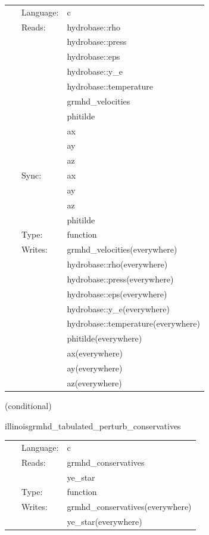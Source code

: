 \documentclass{article}
\begin{document}
 \begin{tabular*}{160mm}{cll} 
~ & Language:  & c \\ 
~ & Reads:  & hydrobase::rho \\ 
~& ~ &hydrobase::press\\ 
~& ~ &hydrobase::eps\\ 
~& ~ &hydrobase::y\_e\\ 
~& ~ &hydrobase::temperature\\ 
~& ~ &grmhd\_velocities\\ 
~& ~ &phitilde\\ 
~& ~ &ax\\ 
~& ~ &ay\\ 
~& ~ &az\\ 
~ & Sync:  & ax \\ 
~& ~ &ay\\ 
~& ~ &az\\ 
~& ~ &phitilde\\ 
~ & Type:  & function \\ 
~ & Writes:  & grmhd\_velocities(everywhere) \\ 
~& ~ &hydrobase::rho(everywhere)\\ 
~& ~ &hydrobase::press(everywhere)\\ 
~& ~ &hydrobase::eps(everywhere)\\ 
~& ~ &hydrobase::y\_e(everywhere)\\ 
~& ~ &hydrobase::temperature(everywhere)\\ 
~& ~ &phitilde(everywhere)\\ 
~& ~ &ax(everywhere)\\ 
~& ~ &ay(everywhere)\\ 
~& ~ &az(everywhere)\\ 
\end{tabular*} 


\vspace{5mm}

   (conditional) 

\hspace{5mm} illinoisgrmhd\_tabulated\_perturb\_conservatives 

\hspace{5mm}{\it tabulated version of illinoisgrmhd\_perturb\_conservatives } 


\hspace{5mm}

 \begin{tabular*}{160mm}{cll} 
~ & Language:  & c \\ 
~ & Reads:  & grmhd\_conservatives \\ 
~& ~ &ye\_star\\ 
~ & Type:  & function \\ 
~ & Writes:  & grmhd\_conservatives(everywhere) \\ 
~& ~ &ye\_star(everywhere)\\ 
\end{tabular*} 
\end{document}
